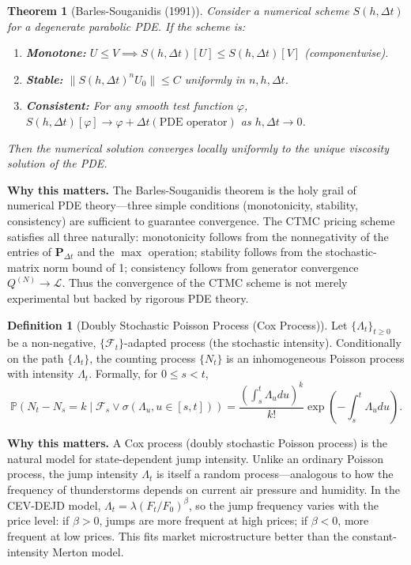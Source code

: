 \documentclass[11pt,a4paper,openany]{book}
\theoremstyle{definition}
\newtheorem{definition}{Definition}[chapter]
\theoremstyle{plain}
\newtheorem{theorem}{Theorem}[chapter]
\theoremstyle{remark}
\newcommand{\1}{\mathbbm{1}}
\newcommand{\F}{\mathcal{F}}
\newcommand{\Pbb}{\mathbb{P}}
\begin{document}
\begin{theorem}[Barles-Souganidis (1991)]
Consider a numerical scheme $S(h, \Delta t)$ for a degenerate parabolic PDE. If the scheme is:
\begin{enumerate}[label=(\arabic*)]
    \item \textbf{Monotone:} $U \leq V \implies S(h, \Delta t)[U] \leq S(h, \Delta t)[V]$ (componentwise).
    \item \textbf{Stable:} $\|S(h, \Delta t)^{n} U_{0}\| \leq C$ uniformly in $n, h, \Delta t$.
    \item \textbf{Consistent:} For any smooth test function $\varphi$, $S(h, \Delta t)[\varphi] \to \varphi + \Delta t(\text{PDE operator})$ as $h, \Delta t \to 0$.
\end{enumerate}
Then the numerical solution converges locally uniformly to the unique viscosity solution of the PDE.
\end{theorem}

\medskip
\noindent\textbf{Why this matters.} The Barles-Souganidis theorem is the holy grail of numerical PDE theory---three simple conditions (monotonicity, stability, consistency) are sufficient to guarantee convergence. The CTMC pricing scheme satisfies all three naturally: monotonicity follows from the nonnegativity of the entries of $\mathbf{P}_{\Delta t}$ and the $\max$ operation; stability follows from the stochastic-matrix norm bound of 1; consistency follows from generator convergence $Q^{(N)} \to \mathcal{L}$. Thus the convergence of the CTMC scheme is not merely experimental but backed by rigorous PDE theory.

\begin{definition}[Doubly Stochastic Poisson Process (Cox Process)]
Let $\{\Lambda_{t}\}_{t \geq 0}$ be a non-negative, $\{\F_{t}\}$-adapted process (the stochastic intensity). Conditionally on the path $\{\Lambda_{t}\}$, the counting process $\{N_{t}\}$ is an inhomogeneous Poisson process with intensity $\Lambda_{t}$. Formally, for $0 \leq s < t$,
\[
\Pbb(N_{t} - N_{s} = k \mid \F_{s} \vee \sigma(\Lambda_{u}, u \in [s,t])) = \frac{(\int_{s}^{t} \Lambda_{u} du)^{k}}{k!} \exp\left(-\int_{s}^{t} \Lambda_{u} du\right).
\]
\end{definition}

\medskip
\noindent\textbf{Why this matters.} A Cox process (doubly stochastic Poisson process) is the natural model for state-dependent jump intensity. Unlike an ordinary Poisson process, the jump intensity $\Lambda_t$ is itself a random process---analogous to how the frequency of thunderstorms depends on current air pressure and humidity. In the CEV-DEJD model, $\Lambda_t = \lambda (F_t/F_0)^\beta$, so the jump frequency varies with the price level: if $\beta > 0$, jumps are more frequent at high prices; if $\beta < 0$, more frequent at low prices. This fits market microstructure better than the constant-intensity Merton model.
\end{document}

